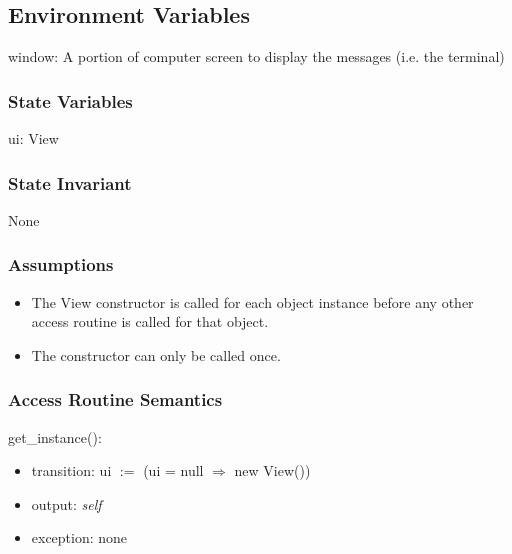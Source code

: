 \documentclass[12pt]{article}
\begin{document}
\subsection*{Environment Variables}

window: A portion of computer screen to display the messages (i.e. the terminal)

\subsubsection* {State Variables}

ui: View

\subsubsection* {State Invariant}

None

\subsubsection* {Assumptions}

\begin{itemize}
  \item The View constructor is called for each object instance before any 
  other access routine is called for that object.  
  \item The constructor can only be called once.
\end{itemize}

\subsubsection* {Access Routine Semantics}

\noindent get\_instance():
\begin{itemize}
\item transition: ui $:=$ (ui = null $\Rightarrow$ new View())
\item output: \textit{self}
\item exception: none
\end{itemize}


\end{document}
